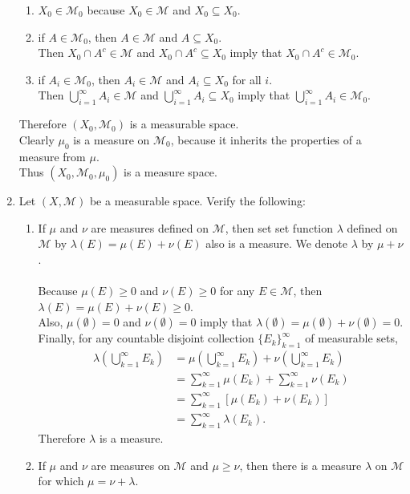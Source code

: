 \begin{enumerate}
\begin{enumerate}[label=(\roman*),align=left]
		\item $X_0\in\mathcal{M}_0$ because $X_0\in\mathcal{M}$ and $X_0\subseteq X_0$.
		\item if $A\in\mathcal{M}_0$, then $A\in\mathcal{M}$ and $A\subseteq X_0$.\\
		Then $X_0\cap A^c\in\mathcal{M}$ and $X_0\cap A^c\subseteq X_0$ imply that $X_0\cap A^c\in\mathcal{M}_0$.
		\item if $A_i\in\mathcal{M}_0$, then $A_i\in\mathcal{M}$ and $A_i\subseteq X_0$ for all $i$.\\
		Then $\bigcup_{i=1}^\infty A_i\in\mathcal{M}$ and $\bigcup_{i=1}^\infty A_i\subseteq X_0$ imply that $\bigcup_{i=1}^\infty A_i\in\mathcal{M}_0$.
	\end{enumerate}
	Therefore $(X_0,\mathcal{M}_0)$ is a measurable space.\\
	Clearly $\mu_0$ is a measure on $\mathcal{M}_0$, because it inherits the properties of a measure from $\mu$.\\
	Thus $(X_0,\mathcal{M}_0,\mu_0)$ is a measure space.
	\item Let $(X,\mathcal{M})$ be a measurable space. Verify the following:
	\begin{enumerate}[label=(\roman*),align=left]  
		\item If $\mu$ and $\nu$ are measures defined on $\mathcal{M}$, then set set function $\lambda$ defined on $\mathcal{M}$ by $\lambda(E)=\mu(E)+\nu(E)$ also is a measure. We denote $\lambda$ by $\mu+\nu$.\\
		\\Because $\mu(E)\ge 0$ and $\nu(E)\ge 0$ for any $E\in\mathcal{M}$, then $\lambda(E)=\mu(E)+\nu(E)\ge 0$.
		\\Also, $\mu(\emptyset)= 0$ and $\nu(\emptyset)= 0$ imply that $\lambda(\emptyset)=\mu(\emptyset)+\nu(\emptyset)= 0$.
		\\Finally, for any countable disjoint collection $\{E_k\}_{k=1}^\infty$ of measurable sets,
		\begin{align*}
			\lambda\left(\bigcup_{k=1}^\infty E_k\right)&=\mu\left(\bigcup_{k=1}^\infty E_k\right)+\nu\left(\bigcup_{k=1}^\infty E_k\right)\\
			&=\sum_{k=1}^\infty\mu(E_k)+\sum_{k=1}^\infty\nu(E_k)\\
			&=\sum_{k=1}^\infty[\mu(E_k)+\nu(E_k)]\\
			&=\sum_{k=1}^\infty\lambda(E_k).
		\end{align*}
		Therefore $\lambda$ is a measure.
		\item If $\mu$ and $\nu$ are measures on $\mathcal{M}$ and $\mu\ge\nu$, then there is a measure $\lambda$ on $\mathcal{M}$ for which $\mu=\nu+\lambda$.\\

\end{enumerate}
\end{enumerate}
